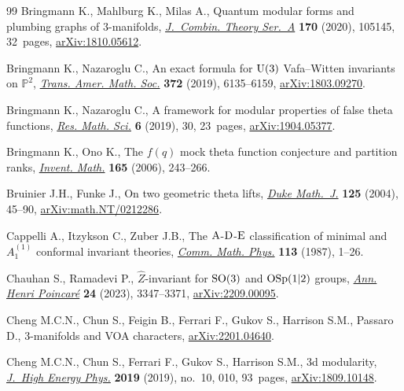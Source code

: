 \begin{thebibliography}{99}
Bringmann K., Mahlburg K., Milas A., Quantum modular forms and plumbing graphs
 of {3}-manifolds, \href{https://doi.org/10.1016/j.jcta.2019.105145}{\textit{J.~Combin. Theory Ser.~A}} \textbf{170} (2020),
 105145, 32~pages, \href{https://arxiv.org/abs/1810.05612}{arXiv:1810.05612}.

Bringmann K., Nazaroglu C., An exact formula for {$\rm U(3)$} {V}afa--{W}itten
 invariants on {$\mathbb P^2$}, \href{https://doi.org/10.1090/tran/7714}{\textit{Trans. Amer. Math. Soc.}} \textbf{372}
 (2019), 6135--6159, \href{https://arxiv.org/abs/1803.09270}{arXiv:1803.09270}.

Bringmann K., Nazaroglu C., A framework for modular properties of false theta
 functions, \href{https://doi.org/10.1007/s40687-019-0192-2}{\textit{Res. Math. Sci.}} \textbf{6} (2019), 30, 23~pages,
 \href{https://arxiv.org/abs/1904.05377}{arXiv:1904.05377}.

Bringmann K., Ono K., The {$f(q)$} mock theta function conjecture and partition
 ranks, \href{https://doi.org/10.1007/s00222-005-0493-5}{\textit{Invent. Math.}} \textbf{165} (2006), 243--266.

Bruinier J.H., Funke J., On two geometric theta lifts, \href{https://doi.org/10.1215/S0012-7094-04-12513-8}{\textit{Duke Math.~J.}}
 \textbf{125} (2004), 45--90, \href{https://arxiv.org/abs/math.NT/0212286}{arXiv:math.NT/0212286}.

Cappelli A., Itzykson C., Zuber J.B., The {${\rm A}$}-{${\rm D}$}-{${\rm E}$}
 classification of minimal and {$A^{(1)}_1$} conformal invariant theories,
 \href{https://doi.org/10.1007/BF01221394}{\textit{Comm. Math. Phys.}} \textbf{113} (1987), 1--26.

Chauhan S., Ramadevi P., {$\hat Z$}-invariant for ${\rm SO}(3)$ and ${\rm
 OSp}(1|2)$ groups, \href{https://doi.org/10.1007/s00023-023-01332-y}{\textit{Ann. Henri Poincar\'e}} \textbf{24} (2023),
 3347--3371, \href{https://arxiv.org/abs/2209.00095}{arXiv:2209.00095}.

Cheng M.C.N., Chun S., Feigin B., Ferrari F., Gukov S., Harrison S.M., Passaro
 D., 3-manifolds and {VOA} characters, \href{https://arxiv.org/abs/2201.04640}{arXiv:2201.04640}.

Cheng M.C.N., Chun S., Ferrari F., Gukov S., Harrison S.M., 3d modularity,
 \href{https://doi.org/10.1007/jhep10(2019)010}{\textit{J.~High Energy Phys.}} \textbf{2019} (2019), no.~10, 010, 93~pages,
 \href{https://arxiv.org/abs/1809.10148}{arXiv:1809.10148}.


\end{thebibliography}

